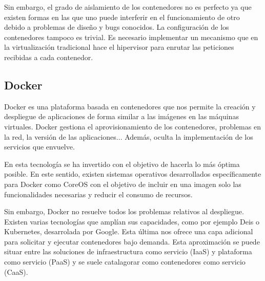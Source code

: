 \documentclass[11pt,a4paper]{article}
\begin{document}
Sin embargo, el grado de aislamiento de los contenedores no es perfecto ya que existen formas en las que uno puede interferir en el funcionamiento de otro debido a problemas de diseño y bugs conocidos. La configuración de los contenedores tampoco es trivial. Es necesario implementar un mecanismo que en la virtualización tradicional hace el hipervisor para enrutar las peticiones recibidas a cada contenedor.

\subsection{Docker}

Docker es una plataforma basada en contenedores que nos permite la creación y despliegue de aplicaciones de forma similar a las imágenes en las máquinas virtuales. Docker gestiona el aprovisionamiento de los contenedores, problemas en la red, la versión de las aplicaciones... Además, oculta la implementación de los servicios que envuelve.

En esta tecnología se ha invertido con el objetivo de hacerla lo más óptima posible. En este sentido, existen sistemas operativos desarrollados específicamente para Docker como CoreOS con el objetivo de incluir en una imagen solo las funcionalidades necesarias y reducir el consumo de recursos.

Sin embargo, Docker no resuelve todos los problemas relativos al despliegue. Existen varias tecnologías que amplían sus capacidades, como por ejemplo Deis o Kubernetes, desarrolada por Google. Esta última nos ofrece una capa adicional para solicitar y ejecutar contenedores bajo demanda. Esta aproximación se puede situar entre las soluciones de infraestructura como servicio (IaaS) y plataforma como servicio (PaaS) y se suele catalagorar como contenedores como servicio (CaaS).
\end{document}
